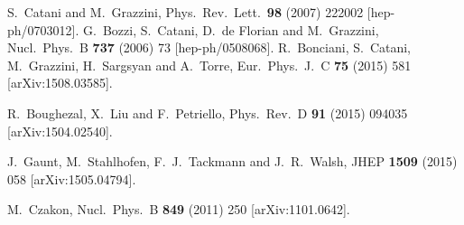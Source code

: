 \documentclass[12pt]{article}
\begin{document}
\newpage
\begin{thebibliography}{99}
  S.~Catani and M.~Grazzini,
  Phys.\ Rev.\ Lett.\  {\bf 98} (2007) 222002
  [hep-ph/0703012].
%
  G.~Bozzi, S.~Catani, D.~de Florian and M.~Grazzini,
  Nucl.\ Phys.\ B {\bf 737} (2006) 73
  [hep-ph/0508068].
%
  R.~Bonciani, S.~Catani, M.~Grazzini, H.~Sargsyan and A.~Torre,
  Eur.\ Phys.\ J.\ C {\bf 75} (2015)   581
  [arXiv:1508.03585].




  R.~Boughezal, X.~Liu and F.~Petriello,
  Phys.\ Rev.\ D {\bf 91} (2015) 094035
  [arXiv:1504.02540].

  J.~Gaunt, M.~Stahlhofen, F.~J.~Tackmann and J.~R.~Walsh,
  JHEP {\bf 1509} (2015) 058
  [arXiv:1505.04794].

  M.~Czakon,
  Nucl.\ Phys.\ B {\bf 849} (2011) 250
  [arXiv:1101.0642].


\end{thebibliography}
\end{document}
